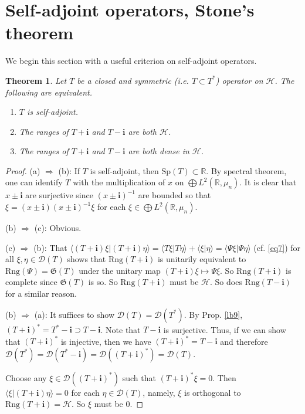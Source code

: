 \documentclass[12pt,b5paper,notitlepage]{article}
\theoremstyle{definition}
\theoremstyle{plain}
\newtheorem{thm}[df]{Theorem}
\newcommand{\fk}{\mathfrak}
\newcommand{\mc}{\mathcal}
\newcommand{\Dom}{\scr D}
\newcommand{\bk}[1]{\langle {#1}\rangle}
\newcommand{\scr}{\mathscr}
\newcommand{\im}{\mathbf{i}}
\newcommand{\Rbb}{\mathbb R}
\newcommand{\Sp}{\mathrm{Sp}}
\newcommand{\Rng}{\mathrm{Rng}}
\numberwithin{equation}{section}
\begin{document}
\section{Self-adjoint operators, Stone's theorem}


We begin this section with a useful criterion on self-adjoint operators.

\begin{thm}
Let $T$ be a closed and symmetric (i.e. $T\subset T^*$) operator on $\mc H$. The following are equivalent.
\begin{enumerate}[label=(\alph*)]
\item $T$ is self-adjoint.
\item The ranges of $T+\im$ and $T-\im$ are both $\mc H$.
\item  The ranges of $T+\im$ and $T-\im$ are both dense in $\mc H$.
\end{enumerate}
\end{thm}


\begin{proof}
(a) $\Rightarrow$ (b): If $T$ is self-adjoint, then $\Sp(T)\subset \Rbb$. By spectral theorem, one can identify $T$ with the multiplication of $x$ on $\bigoplus L^2(\Rbb,\mu_n)$. It is clear that $x\pm\im$ are surjective since $(x\pm\im)^{-1}$ are bounded so that $\xi=(x\pm\im)(x\pm\im)^{-1}\xi$ for each $\xi\in \bigoplus L^2(\Rbb,\mu_n)$.

(b) $\Rightarrow$ (c): Obvious.

(c) $\Rightarrow$ (b): That $\bk{(T+\im)\xi|(T+\im)\eta}=\bk{T\xi|T\eta}+\bk{\xi|\eta}=\bk{\Psi\xi|\Psi\eta}$ (cf. \eqref{eq7}) for all $\xi,\eta\in\Dom(T)$ shows that $\Rng(T+\im)$ is unitarily equivalent to $\Rng(\Psi)=\fk G(T)$ under the unitary map $(T+\im)\xi\mapsto \Psi\xi$. So $\Rng(T+\im)$ is complete since $\fk G(T)$ is so. So $\Rng(T+\im)$ must be $\mc H$. So does $\Rng(T-\im)$ for a similar reason.

(b) $\Rightarrow$ (a): It suffices to show $\Dom(T)=\Dom(T^*)$. By Prop. \ref{lb9}, $(T+\im)^*=T^*-\im\supset T-\im$. Note that $T-\im$ is surjective. Thus, if we can show that $(T+\im)^*$ is injective, then we have $(T+\im)^*=T-\im$ and therefore $\Dom(T^*)=\Dom(T^*-\im)=\Dom((T+\im)^*)=\Dom(T)$.

Choose any $\xi\in\Dom((T+\im)^*)$ such that $(T+\im)^*\xi=0$. Then $\bk{\xi|(T+\im)\eta}=0$ for each $\eta\in\Dom(T)$, namely, $\xi$ is orthogonal to $\Rng(T+\im)=\mc H$. So $\xi$ must be $0$.
\end{proof}
\end{document}
